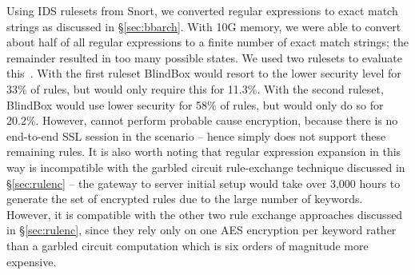 Using IDS rulesets from Snort, we converted regular expressions to exact match strings as discussed in \S\ref{sec:bbarch}. With 10G memory, we were able to convert about half of all regular expressions to a finite number of exact match strings; the remainder resulted in too many possible states. 
We used two rulesets to evaluate this~\cite{emergingthreats, snort-community}. With the first ruleset BlindBox would resort to the lower security level for 33\% of rules, but \sys would only require this for 11.3\%. With the second ruleset, BlindBox would use lower security for 58\% of rules, but \sys would only do so for 20.2\%. However, \sys cannot perform probable cause encryption, because there is no end-to-end SSL session in the \sys scenario -- hence \sys simply does not support these remaining rules. 
It is also worth noting that regular expression expansion in this way is incompatible with the garbled circuit rule-exchange technique discussed in \S\ref{sec:rulenc} -- the gateway to server initial setup would take over 3,000 hours to generate the set of encrypted rules due to the large number of keywords. However, it is compatible with the other two rule exchange approaches discussed in \S\ref{sec:rulenc}, since they rely only on one AES encryption per keyword rather than a garbled circuit computation which is six orders of magnitude more expensive.




%

